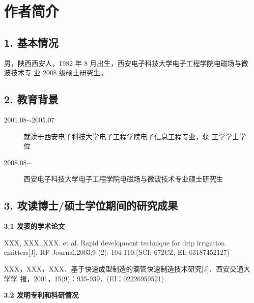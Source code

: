 
\chapter*{作者简介}

\section*{\textbf{\normalsize 1. 基本情况}}

男，陕西西安人，1982 年 8 月出生，西安电子科技大学电子工程学院电磁场与微波技术专
业 2008 级硕士研究生。
\section*{\textbf{\normalsize 2. 教育背景}}

\begin{description}
  \item[2001.08$\sim$2005.07] 就读于西安电子科技大学电子工程学院电子信息工程专业，获
    工学学士学位
  \item[2008.08$\sim$] 西安电子科技大学电子工程学院电磁场与微波技术专业硕士研究生
\end{description}

\section*{\textbf{\normalsize 3. 攻读博士/硕士学位期间的研究成果}}

\noindent\textbf{\small 3.1 发表的学术论文}

\begin{enumerate}[{[}1{]}] \wuhao
\item XXX, XXX, XXX. et al. Rapid development technique for drip irrigation
  emitters[J]. RP Journal,2003,9 (2): 104-110.(SCI: 672CZ, EI: 03187452127)
\item XXX，XXX，XXX．基于快速成型制造的滴管快速制造技术研究[J]．西安交通大学学
  报，2001，15(9)：935-939．(EI：02226959521)
\end{enumerate}

\noindent\textbf{\small 3.2 发明专利和科研情况}

